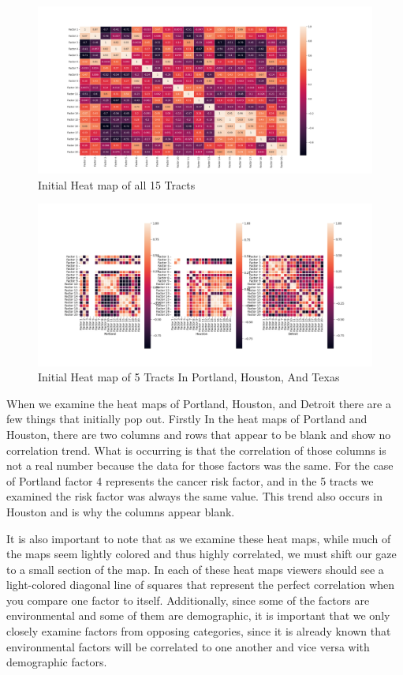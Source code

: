 \documentclass[letterpaper, 10 pt, conference]{ieeeconf}  %
\begin{document}
\begin{figure}
    \centering
    \includegraphics[width=1\linewidth]{Images/initialTotalTractHeatmap.png}
    \caption{Initial Heat map of all 15 Tracts }
    \label{fig:enter-label}
\end{figure}
\begin{figure}
    \centering
    \includegraphics[width=1\linewidth]{Images/InitialTractHeatmap.png}
    \caption{Initial Heat map of 5 Tracts In Portland, Houston, And Texas }
    \label{fig:enter-label}
\end{figure}

When we examine the heat maps of Portland, Houston, and Detroit there are a few things that initially pop out. Firstly In the heat maps of Portland and Houston, there are two columns and rows that appear to be blank and show no correlation trend. What is occurring is that the correlation of those columns is not a real number because the data for those factors was the same. For the case of Portland factor 4 represents the cancer risk factor, and in the 5 tracts we examined the risk factor was always the same value. This trend also occurs in Houston and is why the columns appear blank. \par

It is also important to note that as we examine these heat maps, while much of the maps seem lightly colored and thus highly correlated, we must shift our gaze to a small section of the map. In each of these heat maps viewers should see a light-colored diagonal line of squares that represent the perfect correlation when you compare one factor to itself. Additionally, since some of the factors are environmental and some of them are demographic, it is important that we only closely examine factors from opposing categories, since it is already known that environmental factors will be correlated to one another and vice versa with demographic factors.\par
\end{document}
